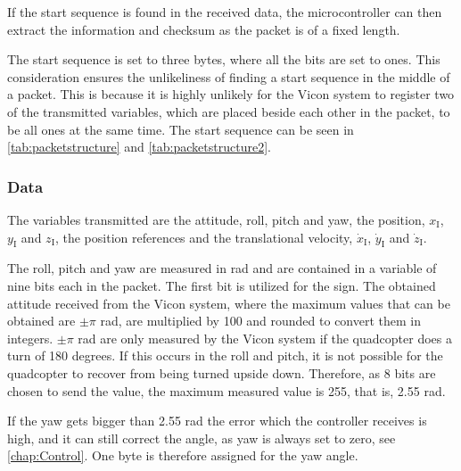 If the start sequence is found in the received data, the microcontroller can then extract the information and checksum as the packet is of a fixed length. 

The start sequence is set to three bytes, where all the bits are set to ones. This consideration ensures the unlikeliness of finding a start sequence in the middle of a packet. This is because it is highly unlikely for the Vicon system to register two of the transmitted variables, which are placed beside each other in the packet, to be all ones at the same time. The start sequence can be seen in \autoref{tab:packetstructure} and \autoref{tab:packetstructure2}.

\subsubsection{Data} 
The variables transmitted are the attitude, roll, pitch and yaw, the position, $x_{\mathrm{I}}$, $y_{\mathrm{I}}$ and $z_{\mathrm{I}}$, the position references and the translational velocity, $\dot{x}_{\mathrm{I}}$, $\dot{y}_{\mathrm{I}}$ and $\dot{z}_{\mathrm{I}}$.

The roll, pitch and yaw are measured in rad and are contained in a variable of nine bits each in the packet. The first bit is utilized for the sign. The obtained attitude received from the Vicon system, where the maximum values that can be obtained are $\pm\pi$ rad, are multiplied by 100 and rounded to convert them in integers. $\pm\pi$ rad are only measured by the Vicon system if the quadcopter does a turn of 180 degrees. If this occurs in the roll and pitch, it is not possible for the quadcopter to recover from being turned upside down. Therefore, as 8 bits are chosen to send the value, the maximum measured value is 255, that is, 2.55 rad.

%
%

If the yaw gets bigger than 2.55 rad the error which the controller receives is high, and it can still correct the angle, as yaw is always set to zero, see \autoref{chap:Control}. One byte is therefore assigned for the yaw angle.

